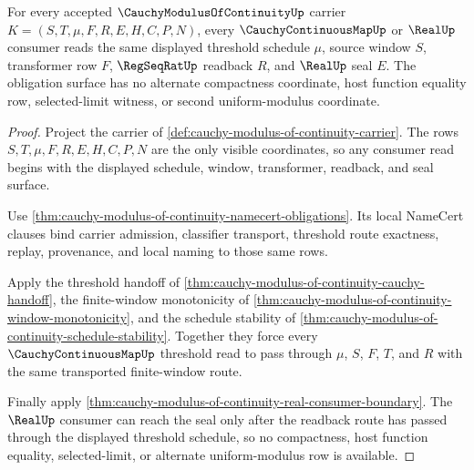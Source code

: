 \begin{theorem}
\label{thm:cauchy-modulus-of-continuity-obligation-exactness}
For every accepted $\CauchyModulusOfContinuityUp$ carrier
$K=(S,T,\mu,F,R,E,H,C,P,N)$, every $\CauchyContinuousMapUp$ or $\RealUp$
consumer reads the same displayed threshold schedule $\mu$, source window
$S$, transformer row $F$, $\RegSeqRatUp$ readback $R$, and $\RealUp$ seal
$E$. The obligation surface has no alternate compactness coordinate, host
function equality row, selected-limit witness, or second uniform-modulus
coordinate.
\end{theorem}
\begin{proof}
Project the carrier of
\autoref{def:cauchy-modulus-of-continuity-carrier}. The rows
$S,T,\mu,F,R,E,H,C,P,N$ are the only visible coordinates, so any consumer
read begins with the displayed schedule, window, transformer, readback, and
seal surface.

Use
\autoref{thm:cauchy-modulus-of-continuity-namecert-obligations}. Its local
NameCert clauses bind carrier admission, classifier transport, threshold
route exactness, replay, provenance, and local naming to those same rows.

Apply the threshold handoff of
\autoref{thm:cauchy-modulus-of-continuity-cauchy-handoff}, the finite-window
monotonicity of
\autoref{thm:cauchy-modulus-of-continuity-window-monotonicity}, and the
schedule stability of
\autoref{thm:cauchy-modulus-of-continuity-schedule-stability}. Together they
force every $\CauchyContinuousMapUp$ threshold read to pass through $\mu$,
$S$, $F$, $T$, and $R$ with the same transported finite-window route.

Finally apply
\autoref{thm:cauchy-modulus-of-continuity-real-consumer-boundary}. The
$\RealUp$ consumer can reach the seal only after the readback route has
passed through the displayed threshold schedule, so no compactness, host
function equality, selected-limit, or alternate uniform-modulus row is
available.
\end{proof}

